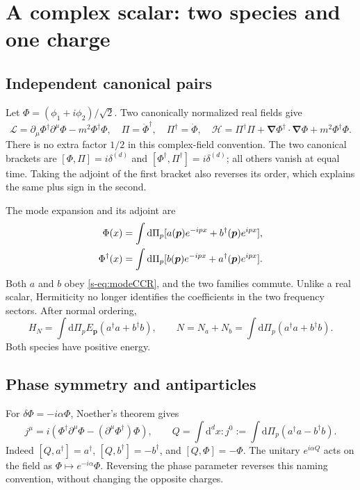 \documentclass[11pt]{article}
\newcommand{\dd}{\mathrm{d}}
\newcommand{\Lag}{\mathcal{L}}
\begin{document}
\section{A complex scalar: two species and one charge}
\subsection{Independent canonical pairs}
Let \(\Phi=(\phi_1+i\phi_2)/\sqrt2\). Two canonically normalized real fields give
\begin{equation}
 \Lag=\partial_\mu\Phi^\dagger\partial^\mu\Phi-m^2\Phi^\dagger\Phi,
 \quad \Pi=\dot\Phi^\dagger,\quad \Pi^\dagger=\dot\Phi,
 \quad \mathcal H=\Pi^\dagger\Pi+\bm\nabla\Phi^\dagger\cdot\bm\nabla\Phi
                 +m^2\Phi^\dagger\Phi.
 \label{s-eq:complexaction}
\end{equation}
There is no extra factor \(1/2\) in this complex-field convention.
The two canonical brackets are
\([\Phi,\Pi]=i\delta^{(d)}\) and
\([\Phi^\dagger,\Pi^\dagger]=i\delta^{(d)}\); all others vanish at equal time.
Taking the adjoint of the first bracket also reverses its order, which
explains the same plus sign in the second.

The mode expansion and its adjoint are
\begin{align}
 \Phi(x)&=\int\dd\Pi_p[a(\bm p)e^{-ipx}+b^\dagger(\bm p)e^{ipx}],\notag\\
 \Phi^\dagger(x)&=\int\dd\Pi_p[b(\bm p)e^{-ipx}+a^\dagger(\bm p)e^{ipx}].
 \label{s-eq:complexmode}
\end{align}
Both \(a\) and \(b\) obey \eqref{s-eq:modeCCR}, and the two families commute.
Unlike a real scalar, Hermiticity no longer identifies the coefficients
in the two frequency sectors. After normal ordering,
\begin{equation}
 H_N=\int\dd\Pi_p E_{\bm p}(a^\dagger a+b^\dagger b),\qquad
 N=N_a+N_b=\int\dd\Pi_p(a^\dagger a+b^\dagger b).
 \label{s-eq:complexH}
\end{equation}
Both species have positive energy.

\subsection{Phase symmetry and antiparticles}
For \(\delta\Phi=-i\alpha\Phi\), Noether's theorem gives
\begin{equation}
 j^\mu=i(\Phi^\dagger\partial^\mu\Phi-
              (\partial^\mu\Phi^\dagger)\Phi),\qquad
 Q=\int\dd^dx:j^0:=\int\dd\Pi_p(a^\dagger a-b^\dagger b).
 \label{s-eq:charge}
\end{equation}
Indeed \([Q,a^\dagger]=a^\dagger\), \([Q,b^\dagger]=-b^\dagger\), and
\([Q,\Phi]=-\Phi\). The unitary \(e^{i\alpha Q}\) acts on the field as
\(\Phi\mapsto e^{-i\alpha}\Phi\). Reversing the phase parameter reverses
this naming convention, without changing the opposite charges.
\end{document}
